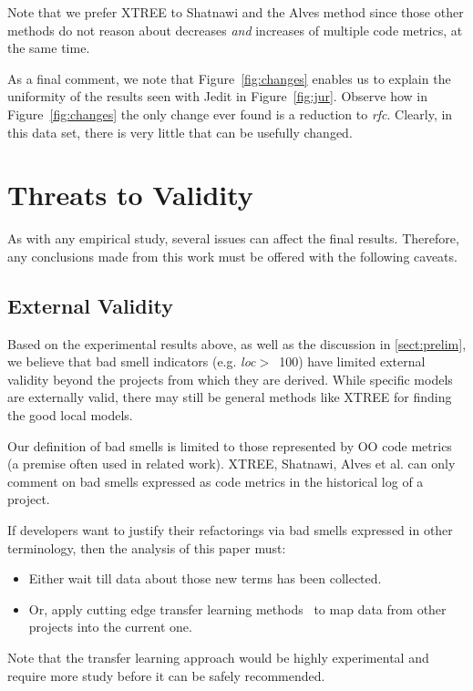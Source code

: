 \documentclass{sig-alternate}
\newcommand{\tion}[1]{\textsection\ref{sect:#1}}
\newcommand{\fig}[1]{Figure~\ref{fig:#1}}
\theoremstyle{break}
\begin{document}
\begin{itemize}
Note that we prefer XTREE to Shatnawi and the Alves
method since those other methods
do not reason
about decreases {\em and} increases of multiple 
code metrics, at the same time.

As a final comment, we note
that  \fig{changes} enables us to explain the uniformity
of the results seen with Jedit in \fig{jur}.
Observe how in \fig{changes} the only change ever
found is a reduction to {\em rfc}. Clearly, in this
data set, there is very little that can be usefully changed.



% 
% 


\section{Threats to Validity}\label{sect:valid}


 
As with any empirical study, several issues can affect the final results. Therefore, any
conclusions made from this work must be offered with the following
caveats.

\subsection{External Validity}
Based on the experimental results above,
as well as the discussion in \tion{prelim},
we believe that bad smell indicators (e.g. \mbox{{\em loc}$>$ 100})
have limited external validity beyond the projects from which they are derived. 
While specific models are externally valid,
there may still be general methods like XTREE for finding the good local models.  


Our definition of bad smells is limited to those represented by OO code metrics (a premise often used in related work).   
XTREE, Shatnawi, Alves et al. can  only comment
on bad smells   expressed as code metrics 
  in the historical log of a project. 


If developers want to justify their refactorings
via bad smells expressed in other terminology,
then the  analysis of this paper must:
\begin{itemize}
    \item Either wait till 
data about those new
terms has been collected. 
\item Or, apply cutting edge transfer learning
methods~\cite{Nam15,Jing15} to map data from other projects
into the current one.
\end{itemize}
Note that the transfer learning approach would
be highly experimental and require more study
before it can be safely recommended.


\end{itemize}
\end{document}
